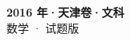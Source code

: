 \documentclass[zihao=-4, a4paper]{ctexart}
\begin{document}
\begin{center}
  {\Large\bfseries 2016 年·天津卷·文科}\\[4pt]
  {\large 数学 · 试题版}
\end{center}
\medskip
{}

\end{document}
